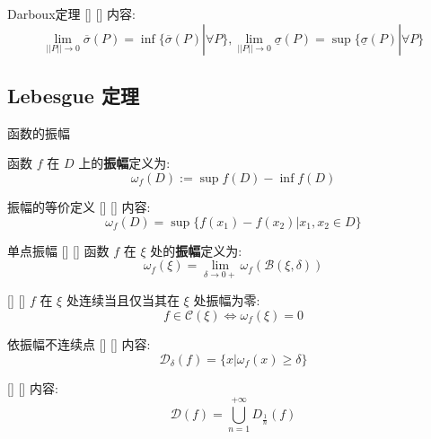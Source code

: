\documentclass[UTF8]{ctexart}
\begin{document}
			\begin{thm}
			    []
			    {Darboux定理}
			    []
			    []
				内容: 
				\[\lim_{||P||\to 0}\overline{\sigma}(P)=\inf\{\overline{\sigma}(P)|\forall P\}, \lim_{||P||\to 0}\underline{\sigma}(P)=\sup\{\underline{\sigma}(P)|\forall P\}\]
			\end{thm}

        \subsection{Lebesgue 定理}
            
            \begin{dfn}
                {函数的振幅}

                函数 \(f\) 在 \(D\) 上的\textbf{振幅}定义为: 
                \[\omega_f(D):=\sup f(D)-\inf f(D)\]
            \end{dfn}

            \begin{ppt}
			    []
			    {振幅的等价定义}
			    []
			    []
                内容: 
                \[\omega_f(D)=\sup\{f(x_1)-f(x_2)|x_1,x_2\in D\}\]
            \end{ppt}
            
            \begin{dfn}
			    []
			    {单点振幅}
			    []
			    []
                函数 \(f\) 在 \(\xi\) 处的\textbf{振幅}定义为: 
                \[\omega_f(\xi)=\lim_{\delta\to 0+}\omega_f(\mathcal{B}(\xi,\delta))\]
            \end{dfn}
            
            \begin{thm}
				[]
				{}
				[]
				[]
                \(f\) 在 \(\xi\) 处连续当且仅当其在 \(\xi\) 处振幅为零: 
                \[f\in\mathcal{C}(\xi)\iff\omega_f(\xi)=0\]
            \end{thm}

            \begin{dfn}
			    []
			    {依振幅不连续点}
			    []
			    []
                内容: 
                \[\mathcal{D}_{\delta}(f)=\{x|\omega_f(x)\geq\delta\}\]
            \end{dfn}
            
            \begin{thm}
				[]
				{}
				[]
				[]
                内容: 
                \[\mathcal{D}(f)=\bigcup_{n=1}^{+\infty}D_{\frac{1}{n}}(f)\]
            \end{thm}
            
\end{document}
